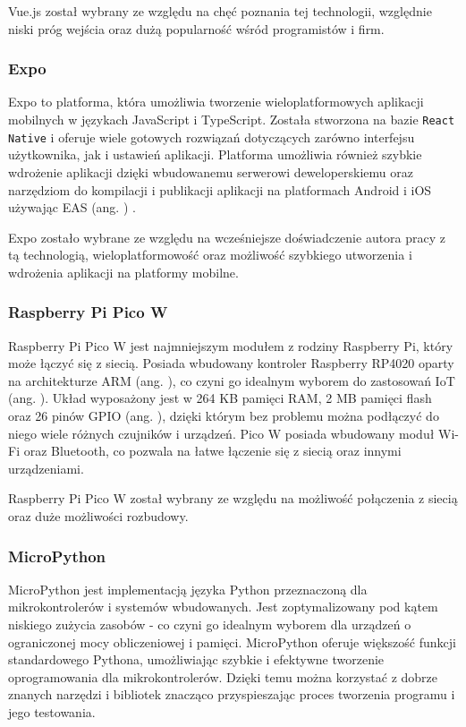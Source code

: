 Vue.js został wybrany ze względu na chęć poznania tej technologii, względnie niski próg wejścia oraz dużą popularność wśród programistów i firm.

\subsubsection*{Expo}

Expo \cite{bib:expo} to platforma, która umożliwia tworzenie wieloplatformowych aplikacji mobilnych w językach JavaScript i TypeScript. Została stworzona na bazie \texttt{React Native} i oferuje wiele gotowych rozwiązań dotyczących zarówno interfejsu użytkownika, jak i ustawień aplikacji. Platforma umożliwia również szybkie wdrożenie aplikacji dzięki wbudowanemu serwerowi deweloperskiemu oraz narzędziom do kompilacji i publikacji aplikacji na platformach Android i iOS używając EAS (ang. ) \cite{bib:eas}.

Expo zostało wybrane ze względu na wcześniejsze doświadczenie autora pracy z tą technologią, wieloplatformowość oraz możliwość szybkiego utworzenia i wdrożenia aplikacji na platformy mobilne.

\subsubsection*{Raspberry Pi Pico W}

Raspberry Pi Pico W \cite{bib:picoW} jest najmniejszym modułem z rodziny Raspberry Pi, który może łączyć się z siecią. Posiada wbudowany kontroler Raspberry RP4020 oparty na architekturze ARM (ang. ), co czyni go idealnym wyborem do zastosowań IoT (ang. ). Układ wyposażony jest w 264 KB pamięci RAM, 2 MB pamięci flash oraz 26 pinów GPIO (ang. ), dzięki którym bez problemu można podłączyć do niego wiele różnych czujników i urządzeń. Pico W posiada wbudowany moduł Wi-Fi oraz Bluetooth, co pozwala na łatwe łączenie się z siecią oraz innymi urządzeniami.

Raspberry Pi Pico W został wybrany ze względu na możliwość połączenia z siecią oraz duże możliwości rozbudowy.

\subsubsection*{MicroPython}

MicroPython \cite{bib:micropython} jest implementacją języka Python przeznaczoną dla mikrokontrolerów i systemów wbudowanych. Jest zoptymalizowany pod kątem niskiego zużycia zasobów - co czyni go idealnym wyborem dla urządzeń o ograniczonej mocy obliczeniowej i pamięci. MicroPython oferuje większość funkcji standardowego Pythona, umożliwiając szybkie i efektywne tworzenie oprogramowania dla mikrokontrolerów. Dzięki temu można korzystać z dobrze znanych narzędzi i bibliotek znacząco przyspieszając proces tworzenia programu i jego testowania.

